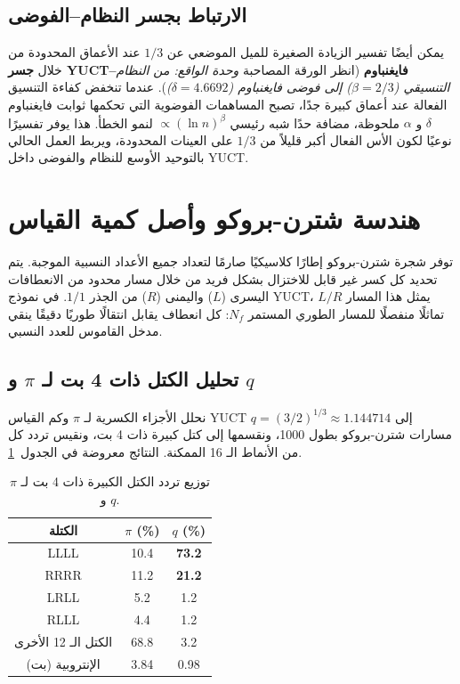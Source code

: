\documentclass[11pt,a4paper]{article}
\begin{document}
	\subsection{الارتباط بجسر النظام–الفوضى}
	يمكن أيضًا تفسير الزيادة الصغيرة للميل الموضعي عن $1/3$ عند الأعماق المحدودة من خلال \textbf{جسر YUCT–فايغنباوم} (انظر الورقة المصاحبة \emph{وحدة الواقع: من النظام التنسيقي (\(\beta=2/3\)) إلى فوضى فايغنباوم (\(\delta=4.6692\))}). عندما تنخفض كفاءة التنسيق الفعالة عند أعماق كبيرة جدًا، تصبح المساهمات الفوضوية التي تحكمها ثوابت فايغنباوم $\delta$ و $\alpha$ ملحوظة، مضافة حدًا شبه رئيسي $\propto (\ln n)^{\beta}$ لنمو الخطأ. هذا يوفر تفسيرًا نوعيًا لكون الأس الفعال أكبر قليلاً من $1/3$ على العينات المحدودة، ويربط العمل الحالي بالتوحيد الأوسع للنظام والفوضى داخل YUCT.
	
	\section{هندسة شترن-بروكو وأصل كمية القياس}
	\label{sec:stern-brocot}
	
	توفر شجرة شترن-بروكو إطارًا كلاسيكيًا صارمًا لتعداد جميع الأعداد النسبية الموجبة. يتم تحديد كل كسر غير قابل للاختزال بشكل فريد من خلال مسار محدود من الانعطافات اليسرى (\(L\)) واليمنى (\(R\)) من الجذر \(1/1\). في نموذج YUCT، يمثل هذا المسار \(L/R\) تماثلًا منفصلًا للمسار الطوري المستمر \(N_f\): كل انعطاف يقابل انتقالًا طوريًا دقيقًا ينقي مدخل القاموس للعدد النسبي.
	
	\subsection{تحليل الكتل ذات 4 بت لـ \(\pi\) و \(q\)}
	
	نحلل الأجزاء الكسرية لـ \(\pi\) وكم القياس YUCT \(q = (3/2)^{1/3} \approx 1.144714\) إلى مسارات شترن-بروكو بطول 1000، ونقسمها إلى كتل كبيرة ذات 4 بت، ونقيس تردد كل من الأنماط الـ 16 الممكنة. النتائج معروضة في الجدول~\ref{tab:block-spectra}.
	
	\begin{table}[htbp]
		\centering
		\caption{توزيع تردد الكتل الكبيرة ذات 4 بت لـ \(\pi\) و \(q\).}
		\label{tab:block-spectra}
		\begin{tabular}{c c c}
			\toprule
			الكتلة & \(\pi\) (\%) & \(q\) (\%) \\
			\midrule
			LLLL & 10.4 & \textbf{73.2} \\
			RRRR & 11.2 & \textbf{21.2} \\
			LRLL & 5.2 & 1.2 \\
			RLLL & 4.4 & 1.2 \\
			الكتل الـ 12 الأخرى & 68.8 & 3.2 \\
			\midrule
			الإنتروبية (بت) & 3.84 & 0.98 \\
			\bottomrule
		\end{tabular}
	\end{table}
	
\end{document}
